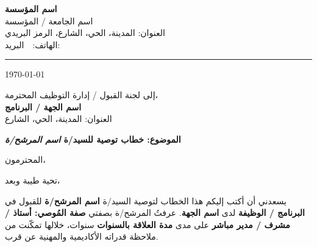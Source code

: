 \documentclass[12pt,a4paper]{article}
\begin{document}
\begin{center}
{\LARGE\bfseries اسم المؤسسة}\\[0.3em]
{\large اسم الجامعة / المؤسسة}\\[0.2em]
{\small العنوان: المدينة، الحي، الشارع، الرمز البريدي}\\[0.2em]
{\small الهاتف:  \,\textbar\, البريد: }
\end{center}

\vspace{0.5em}
\hrule
\vspace{1.5em}

\begin{flushright}
\today
\end{flushright}

\vspace{1em}

\begin{flushright}
إلى لجنة القبول / إدارة التوظيف المحترمة،\\[0.2em]
\textbf{اسم الجهة / البرنامج}\\[0.2em]
العنوان: المدينة، الحي، الشارع
\end{flushright}

\vspace{1em}

\begin{flushright}
\textbf{الموضوع: خطاب توصية للسيد/ة \textit{اسم المرشح/ة}}
\end{flushright}

\vspace{0.5em}

\begin{flushright}
المحترمون،
\end{flushright}

\vspace{0.5em}

تحية طيبة وبعد،

يسعدني أن أكتب إليكم هذا الخطاب لتوصية السيد/ة \textbf{اسم المرشح/ة} للقبول في \textbf{البرنامج / الوظيفة} لدى \textbf{اسم الجهة}. عرفتُ المرشح/ة بصفتي \textbf{صفة المُوصي: أستاذ / مشرف / مدير مباشر} على مدى \textbf{مدة العلاقة بالسنوات} سنوات، خلالها تمكّنت من ملاحظة قدراته الأكاديمية والمهنية عن قرب.
\end{document}
